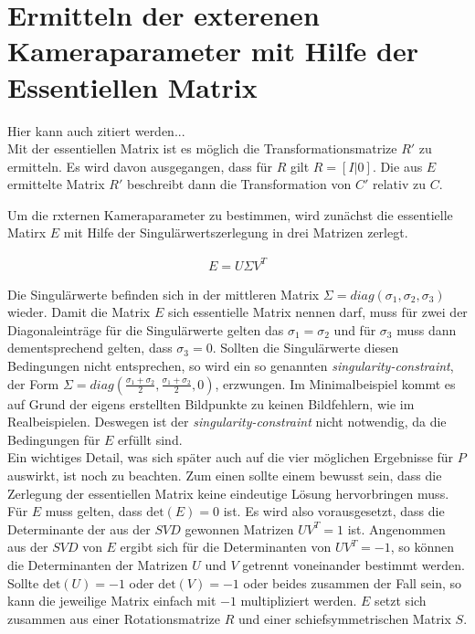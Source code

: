 \section{Ermitteln der exterenen Kameraparameter mit Hilfe der Essentiellen Matrix}

Hier kann auch \cite{Ferid} zitiert werden...\\



Mit der essentiellen Matrix ist es möglich die Transformationsmatrize $R'$ zu ermitteln. Es wird davon ausgegangen, dass für $R$ gilt $R = [I|0]$. Die aus $E$ ermittelte Matrix $R'$ beschreibt dann die Transformation von $C'$ relativ zu $C$\cite{HZ,Ferid}. 

Um die rxternen Kameraparameter zu bestimmen, wird zunächst die essentielle Matirx \ensuremath{E} mit Hilfe der Singulärwertszerlegung in drei Matrizen zerlegt. 

\begin{gather}
E = U\Sigma V^T
\end{gather}

Die Singulärwerte befinden sich in der mittleren Matrix $\Sigma = diag(\sigma_1,\sigma_2,\sigma_3)$ wieder. Damit die Matrix $E$ sich essentielle Matrix nennen darf, muss für zwei der Diagonaleinträge für die Singulärwerte gelten das $\sigma_1 = \sigma_2$ und für $\sigma_3$ muss dann dementsprechend gelten, dass $\sigma_3=0$. Sollten die Singulärwerte diesen Bedingungen nicht entsprechen, so wird ein so genannten \textit{singularity-constraint}, der Form $\Sigma = diag(\frac{\sigma_1+ \sigma_2}{2},\frac{\sigma_1+\sigma_2}{2},0)$, erzwungen\cite{HZ}. Im Minimalbeispiel kommt es auf Grund der eigens erstellten Bildpunkte zu keinen Bildfehlern, wie im Realbeispielen. Deswegen ist der \textit{singularity-constraint} nicht notwendig, da die Bedingungen für $E$ erfüllt sind.\\

Ein wichtiges Detail, was sich später auch auf die vier möglichen Ergebnisse für $P$ auswirkt, ist noch zu beachten. Zum einen sollte einem bewusst sein, dass die Zerlegung der essentiellen Matrix keine eindeutige Lösung hervorbringen muss. Für $E$ muss gelten, dass $\text{det}(E) = 0$ ist. Es wird also vorausgesetzt, dass die Determinante der aus der $SVD$ gewonnen Matrizen $UV^T = 1$ ist. Angenommen aus der $SVD$ von $E$ ergibt sich für die Determinanten von $UV^T = -1$, so können die Determinanten der Matrizen $U$ und $V$ getrennt voneinander bestimmt werden. Sollte $\text{det}(U)=-1$ oder $\text{det}(V)=-1$ oder beides zusammen der Fall sein, so kann die jeweilige Matrix einfach mit $-1$ multipliziert werden. $E$ setzt sich zusammen aus einer Rotationsmatrize $R$ und einer schiefsymmetrischen Matrix $S$.

